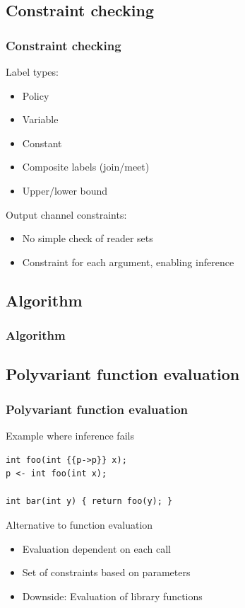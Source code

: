 \documentclass[10pt]{beamer}
\begin{document}
\subsection{Constraint checking}
\begin{frame}
  \frametitle{Constraint checking}

  Label types:
  \begin{itemize}
    \item Policy
    \item Variable
    \item Constant
    \item Composite labels (join/meet)
    \item Upper/lower bound
  \end{itemize}
  \vspace{1em}
  Output channel constraints:
  \begin{itemize}
    \item No simple check of reader sets
    \item Constraint for each argument, enabling inference
  \end{itemize}
\end{frame}

\subsection{Algorithm}
\begin{frame}
  \frametitle{Algorithm}
  \centering

  \scalebox{.9}{
  
  }
\end{frame}

\subsection{Polyvariant function evaluation}
\begin{frame}[fragile]
  \frametitle{Polyvariant function evaluation}

  Example where inference fails
\begin{lstlisting}[style=dlmc]
int foo(int {{p->p}} x);
p <- int foo(int x);

int bar(int y) { return foo(y); }
\end{lstlisting}
  \vspace{1em}
  Alternative to function evaluation
  \begin{itemize}
    \item Evaluation dependent on each call
    \item Set of constraints based on parameters
    \item Downside: Evaluation of library functions
  \end{itemize}
\end{frame}
\end{document}
